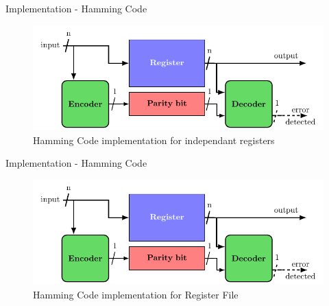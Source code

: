     \begin{frame}{Implementation - Hamming Code}
        \begin{figure}
            \centering
            \includegraphics[width=.9\textwidth, page=2]{src/3_strategies/img/archi_contremesures.pdf}
            \caption{Hamming Code implementation for independant registers}
            \label{fig:hamming_code_implem_independant_register}
        \end{figure}
    \end{frame}
    
    \begin{frame}{Implementation - Hamming Code}
        \begin{figure}
            \centering
            \includegraphics[width=.9\textwidth, page=3]{src/3_strategies/img/archi_contremesures.pdf}
            \caption{Hamming Code implementation for Register File}
            \label{fig:hamming_code_implem_rf}
        \end{figure}
    \end{frame}
